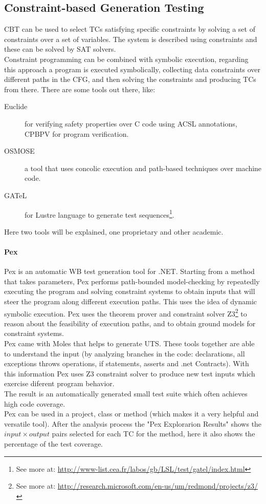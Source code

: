 \subsection{Constraint-based Generation Testing}
\ac{CBT}\cite{DeMillo91constraint-basedautomatic} can be used to select \ac{TC}s satisfying specific constraints by
solving a set of constraints over a set of variables. The system is described using constraints and these can be solved by \ac{SAT} solvers.\\
Constraint programming can be combined with symbolic execution, regarding this approach a program is executed symbolically,
collecting data constraints over different paths in the \ac{CFG}, and then solving the constraints and producing \ac{TC}s from there.
There are some tools out there, like:

\begin{description}
\item[Euclide] for verifying safety properties over C code using \ac{ACSL} annotations, CPBPV for program verification.
\item[OSMOSE] a tool that uses concolic execution and path-based techniques over machine code.
\item[GATeL] for Lustre language to generate test sequences\footnote{See more at: \url{http://www-list.cea.fr/labos/gb/LSL/test/gatel/index.html}}.
\end{description}

Here two tools will be explained, one proprietary and other academic.

\paragraph{Pex} Pex\cite{Tillmann:2008:PWB:1792786.1792798} is an automatic \ac{WB} test generation tool for .NET. Starting from a
method that takes parameters, Pex performs path-bounded model-checking
by repeatedly executing the program and solving constraint systems to obtain inputs that will steer the program along different execution paths.
This uses the idea of dynamic symbolic execution\cite{Tillmann06unittests}. Pex uses the theorem prover and
constraint solver Z3\footnote{See more at: \url{http://research.microsoft.com/en-us/um/redmond/projects/z3/}} to reason about the feasibility of execution paths, and
to obtain ground models for constraint systems.\\
Pex came with Moles that helps to generate \ac{UTS}. These tools together are able to understand the input (by analyzing branches in the code:
declarations, all exceptions throws operations, if statements, asserts and .net Contracts). With this information Pex uses Z3 constraint solver to
produce new test inputs which exercise diferent program behavior.\\
The result is an automatically generated small test suite which often achieves high code coverage.\\
Pex can be used in a project, class or method (which makes it a very helpful and versatile tool). After the analysis process the "Pex Explorarion Results" shows
the $input \times output$ pairs selected for each \ac{TC} for the method, here it also shows the percentage of the test coverage.

